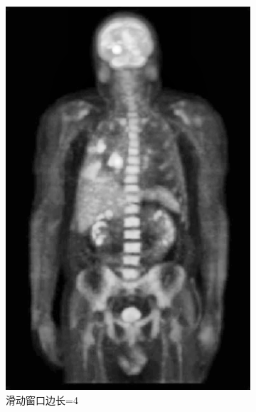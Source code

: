 \documentclass[a4paper]{ctexart}
\newcommand{\outwfour}{0.23\textwidth}
\begin{document}
\begin{spacing}{1.35}
\begin{figure}[htbp]
\begin{subfigure}[t]{\outwfour}
			\includegraphics[width=\textwidth]{figure/2_tile_grid_size_4.png}
			\caption{滑动窗口边长=4}
		\end{subfigure}
		\begin{subfigure}[t]{\outwfour}
			\centering

\end{subfigure}
\end{figure}
\end{spacing}
\end{document}
